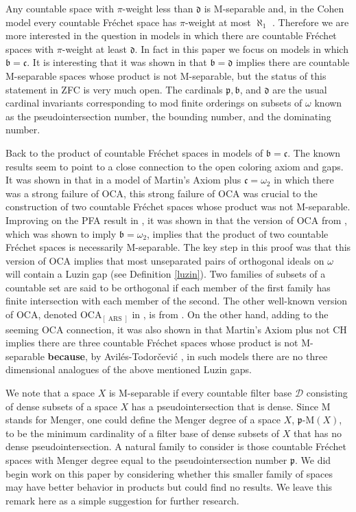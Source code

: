 \documentclass{amsart}
\theoremstyle{definition}
\theoremstyle{remark}
\begin{document}
Any countable space with $\pi$-weight less than $\mathfrak d$
is M-separable and, in the Cohen model every countable
Fr\'echet space has $\pi$-weight at most $\aleph_1$
 \cite{BaDo2}.  Therefore we are more interested in
 the question in models in which there are countable
 Fr\'echet spaces with $\pi$-weight at least  $\mathfrak d$. 
 In fact in this paper we focus on models in which
  $\mathfrak b = \mathfrak c$. It is interesting
  that it was shown in \cite{RZbd} that $\mathfrak b = \mathfrak d$
  implies there are countable M-separable spaces whose product
  is not M-separable, but the status of this statement  in ZFC
  is very much open. The cardinals $\mathfrak p, \mathfrak b$,
  and $\mathfrak d$ are the usual cardinal invariants corresponding
  to mod finite orderings on subsets of $\omega$
  known as the pseudointersection number,
   the bounding number, and the dominating number.
 
 Back to the product of countable Fr\'echet spaces in models
 of $\mathfrak b = \mathfrak c$. The known results seem 
 to point to a close connection to the open coloring axiom
 and gaps. It was shown in \cite{BFZ} that in a model 
 of Martin's Axiom plus $\mathfrak c=\omega_2$ in which
 there was a strong failure of OCA,
  this strong failure of OCA was crucial to the
  construction  of two
 countable Fr\'echet spaces whose product was
 not M-separable. Improving on the PFA result
 in \cite{BaDo2}, it was shown in \cite{MA3} that the
 version of 
 OCA from \cite{StevoPPT}, which was shown  to imply $\mathfrak b=\omega_2$,
 implies that the product of two countable Fr\'echet spaces
 is necessarily M-separable.  The key step in this 
 proof was that this version of OCA  implies that most unseparated pairs
 of orthogonal
 ideals on $\omega$ will contain a Luzin gap (see Definition \ref{luzin}).
 Two families of subsets of a countable set are said to be orthogonal
 if each member of the first family has finite intersection with
 each member of the second.
 The other well-known version of OCA, denoted OCA$_{[\operatorname{ARS}]}$ in 
 \cite{Justin}, is from \cite{ARS}.
 On the other hand, 
 adding to the seeming OCA connection, it was 
 also shown in \cite{MA3} that 
 Martin's Axiom plus not CH implies there are three
 countable Fr\'echet spaces whose product is not M-separable
 \textbf{because}, by Avil\'es-Todor\v{c}evi\'{c} \cite{AvTo11}, in
 such models there are no three dimensional analogues
 of the above mentioned   Luzin gaps.


 
 We note that  a space $X$ is M-separable 
if every countable filter base
$\mathcal D$ consisting of dense subsets of a space $X$
has a pseudointersection that is dense.  
 Since M stands for Menger, one could define the Menger
 degree of a space $X$, $\mathfrak p$-M$(X)$, to 
 be the minimum cardinality of a filter base of
 dense subsets of $X$ that has no dense pseudointersection.
  A natural family to consider is those countable
  Fr\'echet spaces
 with Menger degree equal to the pseudointersection number
  $\mathfrak p$. We did begin work on this paper 
  by considering whether this smaller family
  of spaces may have better behavior in products
  but could find no results. We leave this remark here
as a simple suggestion for further research.
\end{document}
